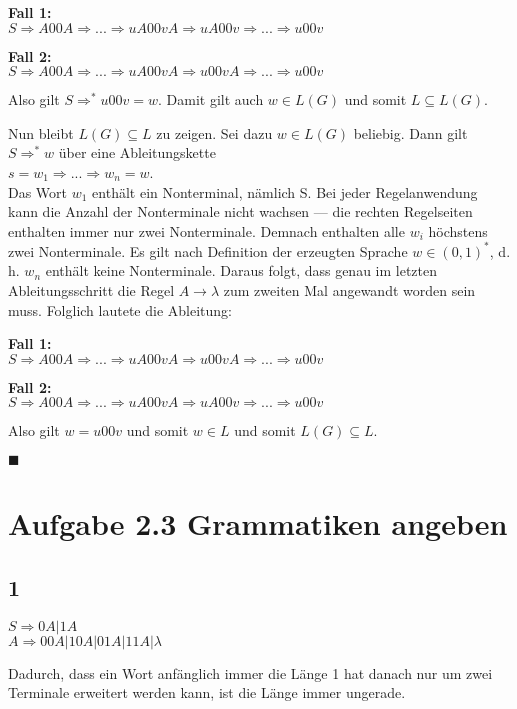 \documentclass[a4paper, fontsize=10pt]{scrartcl}
\begin{document}
\textbf{Fall 1:}\\
$S\Rightarrow A00A\Rightarrow ...\Rightarrow uA00vA\Rightarrow uA00v\Rightarrow...\Rightarrow u00v$\bigskip

\textbf{Fall 2:}\\
$S\Rightarrow A00A\Rightarrow ...\Rightarrow uA00vA\Rightarrow u00vA\Rightarrow ...\Rightarrow u00v$\bigskip

Also gilt $S\Rightarrow^* u00v=w$. Damit gilt auch $w\in L(G)$ und somit $L\subseteq L(G)$.\bigskip

Nun bleibt $L(G)\subseteq L$ zu zeigen. Sei dazu $w\in L(G)$ beliebig. Dann gilt $S\Rightarrow^* w$ über eine Ableitungskette\\
$s=w_1\Rightarrow...\Rightarrow w_n = w$.\\
Das Wort $w_1$ enthält ein Nonterminal, nämlich S. Bei jeder Regelanwendung kann die Anzahl der Nonterminale nicht wachsen --- die rechten Regelseiten enthalten immer nur zwei Nonterminale. Demnach enthalten alle $w_i$ höchstens zwei Nonterminale. Es gilt nach Definition der erzeugten Sprache $w\in (0,1)^*$, d. h. $w_n$ enthält keine Nonterminale. Daraus folgt, dass genau im letzten Ableitungsschritt die Regel $A\rightarrow \lambda$ zum zweiten Mal angewandt worden sein muss. Folglich lautete die Ableitung:\bigskip

\textbf{Fall 1:}\\
$S\Rightarrow A00A\Rightarrow ...\Rightarrow uA00vA \Rightarrow u00vA \Rightarrow ... \Rightarrow u00v$\bigskip

\textbf{Fall 2:}\\
$S\Rightarrow A00A \Rightarrow ... \Rightarrow uA00vA \Rightarrow uA00v \Rightarrow ... \Rightarrow u00v$\bigskip

Also gilt $w=u00v$ und somit $w\in L$ und somit $L(G)\subseteq L$.
\begin{flushright}$\blacksquare$\end{flushright}
\newpage


\section*{Aufgabe 2.3 Grammatiken angeben}
\subsection*{1}
\begin{multicols}{2}
$S\Rightarrow 0A\lvert 1A$\\
$A\Rightarrow 00A\lvert 10A\lvert 01A \lvert 11A\lvert \lambda$\columnbreak

Dadurch, dass ein Wort anfänglich immer die Länge 1 hat danach nur um zwei Terminale erweitert werden kann, ist die Länge immer ungerade.
\end{multicols}
\end{document}
